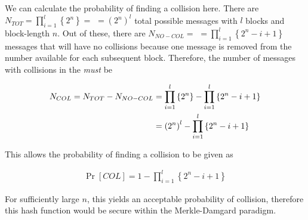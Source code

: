 \documentclass[../midterm.tex]{subfiles}
\begin{document}
\begin{flushleft}




 We can calculate the probability of finding a collision here.  There are $N_{TOT} = \prod_{i = 1}^l \left\{ 2^n \right\} =$ $= \left( 2^n \right)^l$ total possible messages with $l$ blocks and block-length $n$.  Out of these, there are $N_{NO-COL} =$ $= \prod_{i = 1}^l \left\{ 2^n - i + 1 \right\}$ messages that will have no collisions because one message is removed from the number available for each subsequent block. Therefore, the number of messages with collisions in the \emph{must} be

\begin{align}
N_{COL} = N_{TOT} - N_{NO-COL} &= \prod_{i = 1}^l \left\{ 2^n \right\} - \prod_{i = 1}^l \left\{ 2^n - i + 1 \right\} \notag \\
&= \left( 2^n \right)^l - \prod_{i = 1}^l \left\{ 2^n - i + 1 \right\}
\end{align}


This allows the probability of finding a collision to be given as 

\begin{align}
\Pr \left[ COL \right] = 1 - \prod_{i = 1}^l \left\{ 2^n - i + 1 \right\}
\end{align}

For sufficiently large $n$, this yields an acceptable probability of collision, therefore this hash function would be secure within the Merkle-Damgard paradigm.





\end{flushleft}
\end{document}
